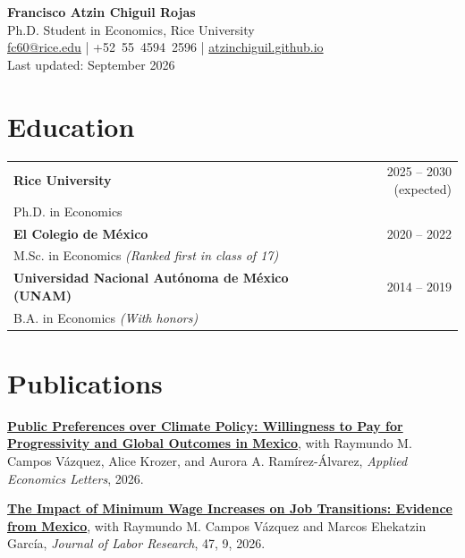 \documentclass[11pt]{article}
\begin{document}
\begin{center}
{\LARGE \textbf{Francisco Atzin Chiguil Rojas}} \\[6pt]
Ph.D. Student in Economics, Rice University \\[6pt]

\href{mailto:fc60@rice.edu}{fc60@rice.edu} \;|\; +52~55~4594~2596 \;|\;
\href{https://atzinchiguil.github.io}{atzinchiguil.github.io} \\[4pt]

{\small Last updated: September 2026}
\end{center}


\section*{Education}

\begin{tabularx}{\textwidth}{X r}
\textbf{Rice University} & 2025 -- 2030 (expected) \\
Ph.D. in Economics & \\[6pt]

\textbf{El Colegio de México} & 2020 -- 2022 \\
M.Sc. in Economics \textit{(Ranked first in class of 17)} & \\[6pt]

\textbf{Universidad Nacional Autónoma de México (UNAM)} & 2014 -- 2019 \\
B.A. in Economics \textit{(With honors)} & \\
\end{tabularx}


\section*{Publications}

\href{https://doi.org/10.1080/13504851.2026.2730496}{\textbf{Public Preferences over Climate Policy: Willingness to Pay for Progressivity and Global Outcomes in Mexico}},
with Raymundo M. Campos Vázquez, Alice Krozer, and Aurora A. Ramírez-Álvarez,
\textit{Applied Economics Letters}, 2026.

\vspace{4pt}

\href{https://doi.org/10.1007/s12122-026-09387-6}{\textbf{The Impact of Minimum Wage Increases on Job Transitions: Evidence from Mexico}},
with Raymundo M. Campos Vázquez and Marcos Ehekatzin García,
\textit{Journal of Labor Research}, 47, 9, 2026.
\end{document}

